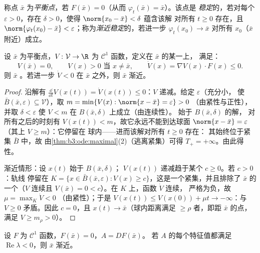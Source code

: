 \begin{definition}\label{def:b3:ode:stability}
称点 $\bar x$ 为\emph{平衡点}，若 $F(\bar x) =
0$（从而 $\varphi_t(\bar x) = \bar x$）。该点是
\emph{稳定}的，若对每个
$\varepsilon > 0$，存在 $\delta > 0$，使得
$\norm{x_0 - \bar x} < \delta$ 蕴含该解
对所有 $t \geq 0$ 存在，且 $\norm{\varphi_t(x_0) - \bar
x} < \varepsilon$；称为\emph{渐近稳定}的，若进一步
$\varphi_t(x_0) \to \bar x$ 对所有 $x_0$（$\bar x$ 附近）成立。
\end{definition}

\begin{theorem}[李雅普诺夫函数]\label{thm:b3:ode:lyapunov}
设 $\bar x$ 为平衡点，$V \colon \mathcal V \to
\R$ 为 $\mathcal C^1$ 函数，定义在 $\bar x$ 的某一上，
满足：
\[
V(\bar x) = 0,\qquad V(x) > 0 \text{ 当 } x \neq \bar x,
\qquad \dot V(x) = \nabla V(x)\cdot F(x) \leq 0 .
\]
则 $\bar x$ 。若进一步 $\dot V < 0$ 在 $\bar
x$ 之外，则 $\bar x$ 渐近。
\end{theorem}

\begin{proof}
沿解有 $\frac{\dd}{\dd t}V(x(t)) = \dot V(x(t))
\leq 0$：$V$ 递减。给定 $\varepsilon$（充分小，
使 $\bar B(\bar x, \varepsilon) \subseteq \mathcal V$），取
$m = \min\{V(x) : \norm{x - \bar x} = \varepsilon\} > 0$
（由紧性与正性），并取 $\delta < \varepsilon$
使 $V < m$ 在 $B(\bar x, \delta)$ 上成立（由连续性）。
始于 $B(\bar x, \delta)$ 的解，
对所有之后的时刻有 $V(x(t)) < m$，故它永远不能到达球面 $\norm{x -
\bar x} = \varepsilon$（其上 $V \geq m$）：它停留在
球内——进而该解对所有 $t \geq 0$ 存在：
其始终位于紧集 $\bar B$ 中，故
由\cref{thm:b3:ode:maximal}(2)（逃离紧集）可得
$T_+ = +\infty$。由此得性。

渐近情形：设 $x(t)$ 始于 $B(\bar x, \delta)$；
$V(x(t))$ 递减趋于某个 $c \geq 0$。若 $c > 0$：轨线
停留在 $K = \{x \in \bar B(\bar x,
\varepsilon): V(x) \geq c\}$，这是一个紧集，并且排除了
$\bar x$ 的一个（$V$ 连续且 $V(\bar x)
= 0 < c$）。在 $K$ 上，函数 $\dot V$ 连续，
严格为负，故 $\mu = \max_K\dot V < 0$
（由紧性）；于是 $V(x(t)) \leq V(x(0)) + \mu t \to
-\infty$：与 $V \geq 0$ 矛盾。因此
$c = 0$，且 $x(t) \to \bar x$（球内距离满足 $\geq
\rho$ 者，即距 $\bar x$ 的点，满足 $V \geq m_\rho >
0$）。
\end{proof}

\begin{theorem}[线性化稳定性]
\label{thm:b3:ode:linearization}
设 $F$ 为 $\mathcal C^1$ 函数，$F(\bar x) = 0$，$A = DF(\bar x)$。
若 $A$ 的每个特征值都满足 $\operatorname{Re}\lambda <
0$，则 $\bar x$ 渐近。
\end{theorem}

